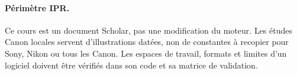 \paragraph{Périmètre IPR.} Ce cours est un document Scholar, pas une
modification du moteur. Les études Canon locales servent d'illustrations
datées, non de constantes à recopier pour Sony, Nikon ou tous les Canon.
Les espaces de travail, formats et limites d'un logiciel doivent être
vérifiés dans son code et sa matrice de validation.









\clearpage



